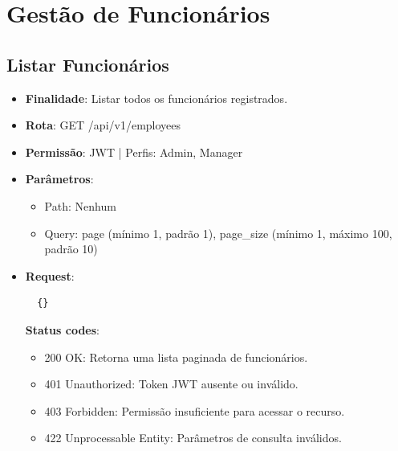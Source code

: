 \section{Gestão de Funcionários}

\subsection{Listar Funcionários}

\begin{itemize}[topsep=1pt, itemsep=0pt]
  \item[]\textbf{Finalidade}: Listar todos os funcionários registrados.

  \item[]\textbf{Rota}: GET /api/v1/employees

  \item[]\textbf{Permissão}: JWT | Perfis: Admin, Manager

  \item[]\textbf{Parâmetros}:
  \begin{itemize}[topsep=1pt, itemsep=0pt]
    \item Path: Nenhum
    \item Query: page (mínimo 1, padrão 1), page\_size (mínimo 1, máximo 100, padrão 10)
  \end{itemize}

  \item[]\textbf{Request}:
  \vspace{-0.3cm}
  \begin{verbatim}
  {}
  \end{verbatim}

  \textbf{Status codes}:
  \begin{itemize}[topsep=1pt, itemsep=0pt]
    \item 200 OK: Retorna uma lista paginada de funcionários.
    \item 401 Unauthorized: Token JWT ausente ou inválido.
    \item 403 Forbidden: Permissão insuficiente para acessar o recurso.
    \item 422 Unprocessable Entity: Parâmetros de consulta inválidos.
  \end{itemize}


\end{itemize}
